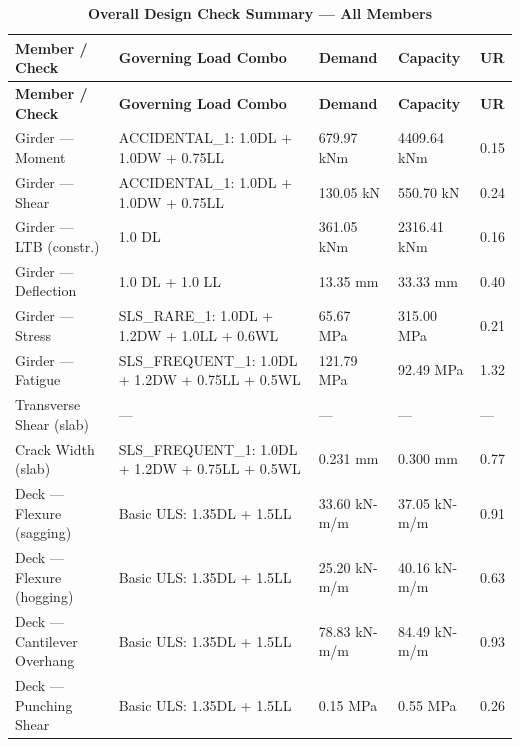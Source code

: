 \documentclass[12pt,a4paper]{report}
\numberwithin{table}{chapter}
\numberwithin{figure}{chapter}
\begin{document}
\vspace{1em}
\begin{longtable}{|C{3.4cm}|L{4.5cm}|C{2.3cm}|C{2.3cm}|>{\centering\arraybackslash}p{1.6cm}|}
\caption{\textbf{Overall Design Check Summary --- All Members}}
\hline
\textbf{Member / Check} & \textbf{Governing Load Combo} & \textbf{Demand} & \textbf{Capacity} & \textbf{UR} \\[6pt]
\hline
\endfirsthead

\hline
\textbf{Member / Check} & \textbf{Governing Load Combo} & \textbf{Demand} & \textbf{Capacity} & \textbf{UR} \\[6pt]
\hline
\endhead
Girder --- Moment & ACCIDENTAL\_\allowbreak{}1:\allowbreak{} 1.0DL + 1.0DW + 0.75LL & 679.97 kNm & 4409.64 kNm & 0.15 \\[6pt]
\hline
Girder --- Shear & ACCIDENTAL\_\allowbreak{}1:\allowbreak{} 1.0DL + 1.0DW + 0.75LL & 130.05 kN & 550.70 kN & 0.24 \\[6pt]
\hline
Girder --- LTB (constr.) & 1.0 DL & 361.05 kNm & 2316.41 kNm & 0.16 \\[6pt]
\hline
Girder --- Deflection & 1.0 DL + 1.0 LL & 13.35 mm & 33.33 mm & 0.40 \\[6pt]
\hline
Girder --- Stress & SLS\_\allowbreak{}RARE\_\allowbreak{}1:\allowbreak{} 1.0DL + 1.2DW + 1.0LL + 0.6WL & 65.67 MPa & 315.00 MPa & 0.21 \\[6pt]
\hline
Girder --- Fatigue & SLS\_\allowbreak{}FREQUENT\_\allowbreak{}1:\allowbreak{} 1.0DL + 1.2DW + 0.75LL + 0.5WL & 121.79 MPa & 92.49 MPa & 1.32 \\[6pt]
\hline
Transverse Shear (slab) & --- & --- & --- & --- \\[6pt]
\hline
Crack Width (slab) & SLS\_\allowbreak{}FREQUENT\_\allowbreak{}1:\allowbreak{} 1.0DL + 1.2DW + 0.75LL + 0.5WL & 0.231 mm & 0.300 mm & 0.77 \\[6pt]
\hline
Deck --- Flexure (sagging) & Basic ULS: 1.35DL + 1.5LL & 33.60 kN-m/m & 37.05 kN-m/m & 0.91 \\[6pt]
\hline
Deck --- Flexure (hogging) & Basic ULS: 1.35DL + 1.5LL & 25.20 kN-m/m & 40.16 kN-m/m & 0.63 \\[6pt]
\hline
Deck --- Cantilever Overhang & Basic ULS: 1.35DL + 1.5LL & 78.83 kN-m/m & 84.49 kN-m/m & 0.93 \\[6pt]
\hline
Deck --- Punching Shear & Basic ULS: 1.35DL + 1.5LL & 0.15 MPa & 0.55 MPa & 0.26 \\[6pt]

\end{longtable}
\end{document}
